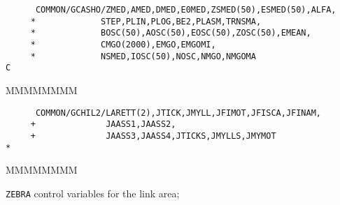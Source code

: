 \begin{verbatim}
      COMMON/GCASHO/ZMED,AMED,DMED,E0MED,ZSMED(50),ESMED(50),ALFA,
     *             STEP,PLIN,PLOG,BE2,PLASM,TRNSMA,
     *             BOSC(50),AOSC(50),EOSC(50),ZOSC(50),EMEAN,
     *             CMGO(2000),EMGO,EMGOMI,
     *             NSMED,IOSC(50),NOSC,NMGO,NMGOMA
C
\end{verbatim}
\begin{DLtt}{MMMMMMMM}
\item[ZMED]
\item[AMED]
\item[DMED]
\item[E0MED]
\item[ZSMED]
\item[ESMED]
\item[ALFA]
\item[STEP]
\item[PLIN]
\item[PLOG]
\item[BE2]
\item[PLASM]
\item[TRNSMA]
\item[BOSC]
\item[AOSC]
\item[EOSC]
\item[ZOSC]
\item[EMEAN]
\item[CMGO]
\item[EMGO]
\item[EMGOMI]
\item[NSMED]
\item[IOSC]
\item[NOSC]
\item[NMGO]
\item[NMGOMA]
\end{DLtt}

\begin{verbatim}
      COMMON/GCHIL2/LARETT(2),JTICK,JMYLL,JFIMOT,JFISCA,JFINAM,
     +              JAASS1,JAASS2,
     +              JAASS3,JAASS4,JTICKS,JMYLLS,JMYMOT
*
\end{verbatim}
\begin{DLtt}{MMMMMMMM}
\item[LARETT] {\tt ZEBRA} control variables for the link area;
\item[JTICK]
\item[JMYLL]
\item[JFIMOT]
\item[JFISCA]
\item[JFINAM]
\item[JAASS1]
\item[JAASS2]
\item[JAASS3]
\item[JAASS4]
\item[JTICKS]
\item[JMYLLS]
\item[JMYMOT]
\end{DLtt}

